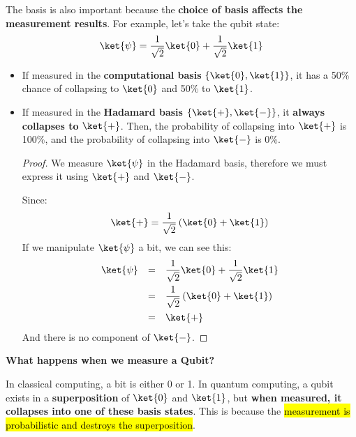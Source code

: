 \highspace
The basis is also important because the \textbf{choice of basis affects the measurement results}. For example, let's take the qubit state:
\begin{equation*}
    \ket{\psi} = \dfrac{1}{\sqrt{2}} \ket{0} + \dfrac{1}{\sqrt{2}} \ket{1}
\end{equation*}
\begin{itemize}
    \item If measured in the \textbf{computational basis} $\left\{\ket{0}, \ket{1}\right\}$, it has a 50\% chance of collapsing to $\ket{0}$ and 50\% to $\ket{1}$.
    \item If measured in the \textbf{Hadamard basis} $\left\{\ket{+}, \ket{-}\right\}$, it \textbf{always collapses to} $\ket{+}$. Then, the probability of collapsing into $\ket{+}$ is 100\%, and the probability of collapsing into $\ket{-}$ is 0\%.
    \begin{proof}
        We measure $\ket{\psi}$ in the Hadamard basis, therefore we must express it using $\ket{+}$ and $\ket{-}$.

        Since:
        \begin{equation*}
            \ket{+} = \dfrac{1}{\sqrt{2}} \left(\ket{0} + \ket{1}\right)
        \end{equation*}
        If we manipulate $\ket{\psi}$ a bit, we can see this:
        \begin{equation*}
            \begin{array}{rcl}
                \ket{\psi} &=& \dfrac{1}{\sqrt{2}} \ket{0} + \dfrac{1}{\sqrt{2}} \ket{1} \\ [1em]
                &=& \dfrac{1}{\sqrt{2}} \left(\ket{0} + \ket{1}\right) \\ [1em]
                &=& \ket{+}
            \end{array}
        \end{equation*}
        And there is no component of $\ket{-}$.
    \end{proof}
\end{itemize}

\newpage

\begin{flushleft}
    \textcolor{Green3}{ \textbf{What happens when we measure a Qubit?}}
\end{flushleft}
In classical computing, a bit is either 0 or 1. In quantum computing, a qubit exists in a \textbf{superposition} of $\ket{0}$ and $\ket{1}$, but \textbf{when measured, it collapses into one of these basis states}. This is because the \hl{measurement is probabilistic and destroys the superposition}.

